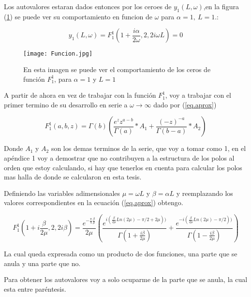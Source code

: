 Los autovalores estaran dados entonces por los ceroes de $y_1 (L,\omega)$,en la figura (\ref{fig:funcion}) se puede ver su comportamiento en funcion de $\omega$ para  $\alpha=1, \ L=1$.:


\begin{equation}
y_1 (L, \omega) = F _1 ^1 (1+\frac{i \alpha}{2 \omega},2,2 i \omega L)  = 0
\end{equation}

\begin{figure}
\centering
\texttt{[image: Funcion.jpg]}
\caption{En esta imagen se puede ver el comportamiento de los ceros de función $F _1 ^1$, para $\alpha=1$ y $L=1$}
\label{fig:funcion}
\end{figure}

A partir de ahora en vez de trabajar con la función $F _1 ^1$, voy a trabajar con el primer termino de su desarrollo en serie a $ \omega \rightarrow \infty  $ dado por (\ref{eq.aprox}) 

\begin{equation}
    F _1 ^1 (a,b,z) = \Gamma (b) 
    \left(
    \frac{e^z z ^{a-b} }{\Gamma(a)} * A_1 + \frac{(-z) ^{ -a}}{ \Gamma(b-a)} 
    * A_2
    \right)
\label{eq.aprox}
\end{equation}

Donde $A_1$ y $A_2$ son los demas terminos de la serie, que voy a tomar como 1, en el apéndice 1 voy a demostrar que no contribuyen a la estructura de los polos al orden que estoy calculando, si hay que tenerlos en cuenta para calcular los polos mas halla de donde se calcularon en esta tesis.

Definiendo las variables adimensionales $\mu = \omega L$  y $\beta = \alpha L $ y reemplazando los valores correspondientes en la ecuación (\ref{eq.aprox}) obtengo. 

\begin{equation}
    F _1 ^1 (1+ i \frac{  \beta}{2 \mu} ,2 ,2 i \beta ) = 
    \frac{e ^{- \frac{\pi}{4} \frac{\beta}{\mu} } }{2 \mu}
    \left(
    \frac{e ^{i (\frac{\beta}{2 \mu} Ln(2 \mu) - \pi/2+ 2 \mu))}}{\Gamma(1+\frac{i \beta}{2 \mu})} + 
    \frac{e ^{- i (\frac{\beta}{2 \mu} Ln(2 \mu) - \pi/2 ))}}{\Gamma(1-\frac{i \beta}{2 \mu})}
    \right)
\label{eq.completa}
\end{equation}




La cual queda expresada como un producto de dos funciones, una parte que se anula y una parte que no.

Para obtener los autovalores voy a solo ocuparme de la parte que se anula, la cual esta entre paréntesis.

